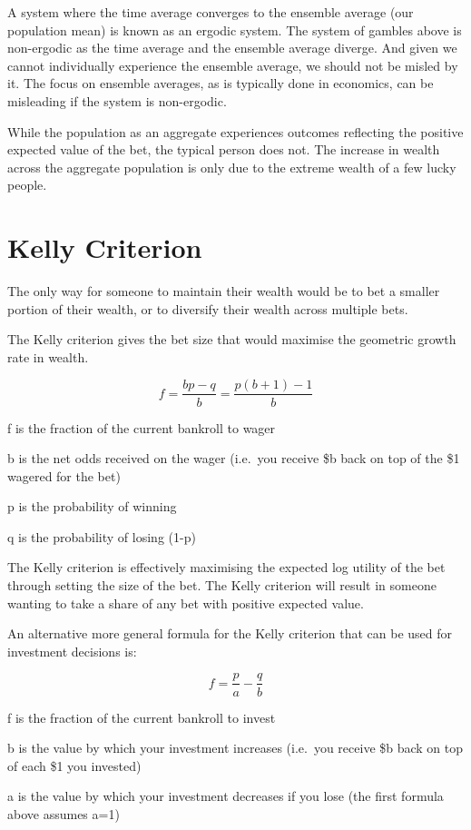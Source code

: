 \documentclass[
]{book}
\begin{document}
A system where the time average converges to the ensemble average
(our population mean) is known as an ergodic system.
The system of gambles above is non-ergodic as the time average
and the ensemble average diverge.
And given we cannot individually experience the ensemble average,
we should not be misled by it.
The focus on ensemble averages, as is typically done in economics,
can be misleading if the system is non-ergodic.

While the population as an aggregate experiences outcomes reflecting
the positive expected value of the bet, the typical person does not.
The increase in wealth across the aggregate population is only
due to the extreme wealth of a few lucky people.

\hypertarget{kelly-criterion}{%
\section{Kelly Criterion}\label{kelly-criterion}}

The only way for someone to maintain their wealth would be
to bet a smaller portion of their wealth,
or to diversify their wealth across multiple bets.

The Kelly criterion gives the bet size that would maximise the geometric growth rate in wealth.

\[f = \frac{bp-q}{b} = \frac{p(b+1)-1}{b}\]

f is the fraction of the current bankroll to wager

b is the net odds received on the wager (i.e.~you receive \$b back on top of the \$1 wagered for the bet)

p is the probability of winning

q is the probability of losing (1-p)

The Kelly criterion is effectively maximising the expected log utility of the bet
through setting the size of the bet.
The Kelly criterion will result in someone wanting to take
a share of any bet with positive expected value.

An alternative more general formula for the Kelly criterion that can be used for investment decisions is:

\[f = \frac{p}{a} - \frac{q}{b}\]

f is the fraction of the current bankroll to invest

b is the value by which your investment increases (i.e.~you receive \$b back on top of each \$1 you invested)

a is the value by which your investment decreases if you lose (the first formula above assumes a=1)
\end{document}
